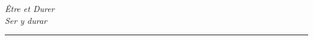 \chapter*{} %


\begin{flushright}
    \textit{Être et Durer} \\
    \textit{Ser y durar} \\
    \rule{5cm}{0.5pt} 
\end{flushright}

